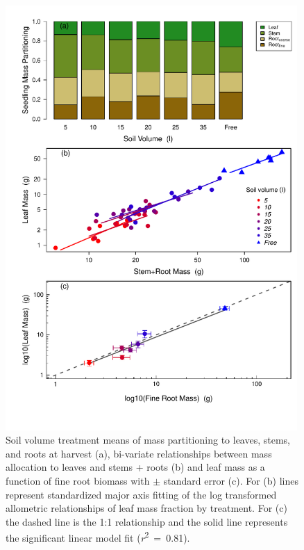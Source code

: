\documentclass[a4paper]{article}\usepackage[]{graphicx}\usepackage[]{color}
\begin{document}
\begin{figure}[h!]
    \centering
    \includegraphics[width=0.99\textwidth]{massfractions.pdf}
    \caption{Soil volume treatment means of mass partitioning to leaves, stems, and roots at harvest (a), bi-variate relationships between mass allocation to leaves and stems + roots (b) and leaf mass as a function of fine root biomass with $\pm$ standard error (c). For (b) lines represent standardized major axis fitting of the log transformed allometric relationships of leaf mass fraction by treatment. For (c) the dashed line is the 1:1 relationship and the solid line represents the significant linear model fit (\textit{r}\textsuperscript{2}~=~0.81).}
    \label{fig:figure3}
\end{figure}
\end{document}
